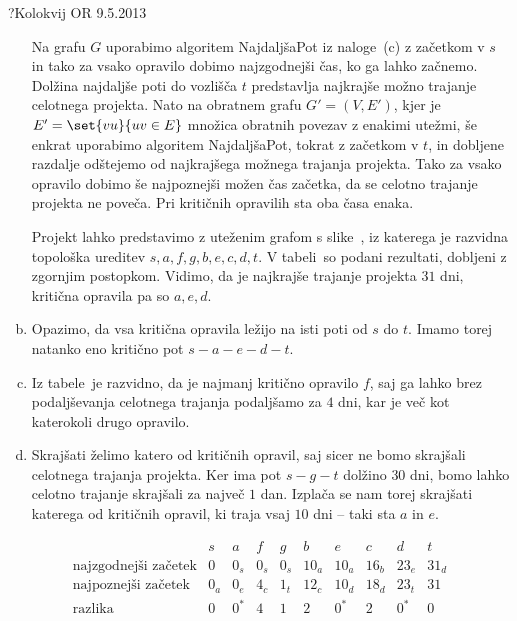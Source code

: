 \begin{naloga}{?}{Kolokvij OR 9.5.2013}
\begin{odgovor}
\begin{enumerate}[(a)]
Na grafu $G$ uporabimo algoritem {\sc NajdaljšaPot} iz naloge~\res[topo]{}(c)
z začetkom v $s$ in tako za vsako opravilo dobimo najzgodnejši čas,
ko ga lahko začnemo.
Dolžina najdaljše poti do vozlišča $t$
predstavlja najkrajše možno trajanje ce\-lot\-ne\-ga projekta.
Nato na obratnem grafu $G' = (V, E')$,
kjer je $E' = \set{vu}{uv \in E}$ množica obratnih povezav z enakimi utežmi,
še enkrat uporabimo algoritem {\sc NajdaljšaPot}, tokrat z začetkom v $t$,
in dobljene razdalje odštejemo od najkrajšega možnega trajanja projekta.
Tako za vsako opravilo dobimo še najpoznejši možen čas začetka,
da se celotno trajanje projekta ne poveča.
Pri kritičnih opravilih sta oba časa enaka.

Projekt lahko predstavimo z uteženim grafom s slike~\fig,
iz katerega je razvidna topološka ureditev $s, a, f, g, b, e, c, d, t$.
V tabeli~ so podani rezultati,
dobljeni z zgornjim postopkom.
Vidimo, da je najkrajše trajanje projekta $31$ dni,
kritična opravila pa so $a, e, d$.

\item Opazimo, da vsa kritična opravila ležijo na isti poti od $s$ do $t$.
Imamo torej natanko eno kritično pot $s - a - e - d - t$.

\item Iz tabele~ je razvidno,
da je najmanj kritično opravilo $f$,
saj ga lahko brez podaljševanja celotnega trajanja podaljšamo za $4$ dni,
kar je več kot katerokoli drugo opravilo.

\item Skrajšati želimo katero od kritičnih opravil,
saj sicer ne bomo skrajšali celotnega trajanja projekta.
Ker ima pot $s - g - t$ dolžino $30$ dni,
bomo lahko celotno trajanje skrajšali za največ $1$ dan.
Izplača se nam torej skrajšati katerega od kritičnih opravil,
ki traja vsaj $10$ dni -- taki sta $a$ in $e$.
\end{enumerate}
%
\begin{slika}
\pgfslika
{}
\end{slika}
%
\begin{tabela}
$$
\begin{array}{r|ccccccccc}
& s & a & f & g & b & e & c & d & t \\ \hline
\text{najzgodnejši začetek} &
0 & 0_s & 0_s & 0_s & 10_a & 10_a & 16_b & 23_e & 31_d \\
\text{najpoznejši začetek} &
0_a & 0_e & 4_c & 1_t & 12_c & 10_d & 18_d & 23_t & 31 \\
\text{razlika} &
0 & 0^* & 4 & 1 & 2 & 0^* & 2 & 0^* & 0
\end{array}
$$
\end{tabela}
\end{odgovor}
\end{naloga}
